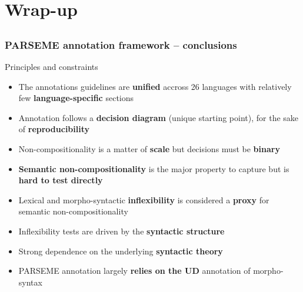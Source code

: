 \documentclass[xcolor=dvipsnames]{beamer}
\begin{document}
\section{Wrap-up}  
\subsection{}

\begin{frame}
   \frametitle{PARSEME annotation framework -- conclusions}

\begin{scriptsize}

\begin{block}{Principles and constraints} 
\begin{itemize}
\item The annotations guidelines are \textbf{unified} accross 26 languages with relatively few \textbf{language-specific} sections 
\item Annotation follows a \textbf{decision diagram} (unique starting point), for the sake of \textbf{reproducibility}
\item Non-compositionality is a matter of \textbf{scale} but decisions must be \textbf{binary}
\item \textbf{Semantic non-compositionality} is the major property to capture but is \textbf{hard to test directly}
\item Lexical and morpho-syntactic \textbf{inflexibility} is considered a \textbf{proxy} for semantic non-compositionality
\item Inflexibility tests are driven by the \textbf{syntactic structure}
\item Strong dependence on the underlying \textbf{syntactic theory}
\item PARSEME annotation largely \textbf{relies on the UD} annotation of morpho-syntax
\end{itemize}
\end{block}

\end{scriptsize}

\end{frame}


\setcounter{finalframe}{\value{framenumber}}

\end{document}

